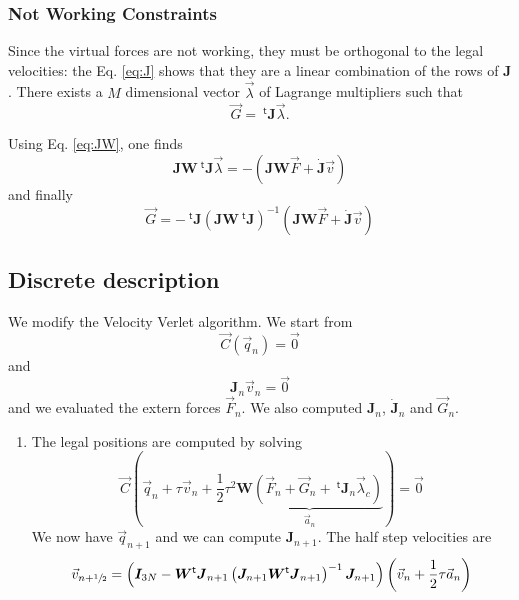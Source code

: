 \documentclass[aps,onecolumn]{revtex4}
\newcommand{\mymat}[1]{\boldsymbol{#1}}
\newcommand{\mytrn}[1]{{\!\!~^{\mathsf{t}}{#1}}}
\newcommand{\half}{\sfrac{1}{2}}
\begin{document}
\subsubsection{Not Working Constraints}
Since the virtual forces are not working, they must be orthogonal to the legal velocities: the Eq. \eqref{eq:J}
shows that they are a linear combination of the rows of $\mymat{J}$.
There exists a $M$ dimensional vector $\vec{\lambda}$ 
of Lagrange multipliers
such that
\begin{equation}
	\vec{G} = \mytrn{\mymat{J}}\vec{\lambda}.
\end{equation}

Using Eq. \eqref{eq:JW}, one finds
\begin{equation}
	\mymat{J}\mymat{W} \mytrn{\mymat{J}}\vec{\lambda} = -\left(\mymat{J}\mymat{W}\vec{F} + \dot{\mymat{J}}\vec{v}\right)
\end{equation}
and finally
\begin{equation}
	\vec{G} = - \mytrn{\mymat{J}}\left(\mymat{J}\mymat{W} \mytrn{\mymat{J}}\right)^{-1}\left(\mymat{J}\mymat{W}\vec{F} + \dot{\mymat{J}}\vec{v}\right)
\end{equation}

\subsection{Discrete description}

We modify the Velocity Verlet algorithm.
We start from
$$
	\vec{C}(\vec{q}_n)=\vec{0}  
$$
and
$$
 \mymat{J}_n \vec{v}_n = \vec{0}
$$
and we evaluated the extern forces $\vec{F}_n$.
We also computed  $\mymat{J}_n$, $\dot{\mymat{J}}_n$ and $\vec{G}_n$.
\begin{enumerate}
\item	
The legal positions are computed by solving
	\begin{equation}
		\vec{C}\left(\vec{q}_n + \tau \vec{v}_n + \dfrac{1}{2}\tau^2\underbrace{\mymat{W}(\vec{F}_n+\vec{G}_n+\mytrn{\mymat{J}}_n \vec{\lambda}_c)}_{\vec{a}_n}\right) = \vec{0}
	\end{equation}
We now have $\vec{q}_{n+1}$ and we can compute $\mymat{J}_{n+1}$.
The half step velocities are
\begin{equation}
	\vec{v}_{n+\half} = 
	\left(\mymat{I}_{3N} - \mymat{W}\mytrn{\mymat{J}}_{n+1} \left(\mymat{J}_{n+1}\mymat{W} \mytrn{\mymat{J}}_{n+1}\right)^{-1}\mymat{J}_{n+1} \right) \left( \vec{v}_{n} + \dfrac{1}{2} \tau \vec{a}_n \right)
\end{equation}

\end{enumerate}
\end{document}
